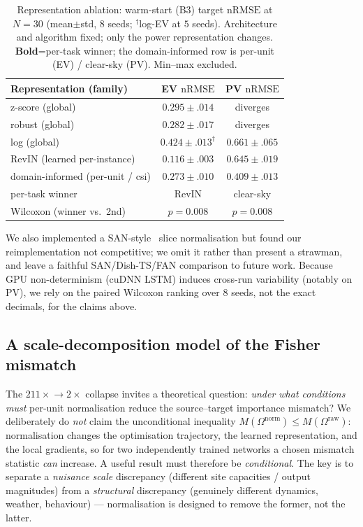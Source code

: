 \documentclass[conference]{IEEEtran}
\newcommand{\nrmse}{\mathrm{nRMSE}}
\begin{document}
\begin{table}[t]
\centering
\caption{Representation ablation: warm-start (B3) target $\nrmse$ at $N{=}30$
(mean$\pm$std, $8$ seeds; $^\dagger$log-EV at $5$ seeds). Architecture and algorithm
fixed; only the power representation changes. \textbf{Bold}=per-task winner; the
domain-informed row is per-unit (EV) / clear-sky (PV). Min--max excluded.}
\label{tab:ablation}
\begin{tabular}{lcc}
\toprule
Representation (family) & EV $\nrmse$ & PV $\nrmse$\\
\midrule
z-score (global)                 & $0.295\pm.014$ & diverges\\
robust (global)                  & $0.282\pm.017$ & diverges\\
log (global)                     & $0.424\pm.013^\dagger$ & $0.661\pm.065$\\
RevIN (learned per-instance)     & $\mathbf{0.116\pm.003}$ & $0.645\pm.019$\\
domain-informed (per-unit / csi) & $0.273\pm.010$ & $\mathbf{0.409\pm.013}$\\
\midrule
per-task winner                  & RevIN & clear-sky\\
Wilcoxon (winner vs.\ 2nd)       & $p{=}0.008$ & $p{=}0.008$\\
\bottomrule
\end{tabular}
\end{table}

\noindent We also implemented a SAN-style~\cite{SAN2023} slice normalisation but
found our reimplementation not competitive; we omit it rather than present a
strawman, and leave a faithful SAN/Dish-TS/FAN comparison to future work. Because
GPU non-determinism (cuDNN LSTM) induces cross-run variability (notably on PV), we
rely on the paired Wilcoxon ranking over $8$ seeds, not the exact decimals, for the
claims above.

\subsection{A scale-decomposition model of the Fisher mismatch}
\label{sec:scale-model}
The $211\times\!\to\!2\times$ collapse invites a theoretical question: \emph{under
what conditions must} per-unit normalisation reduce the source--target importance
mismatch? We deliberately do \emph{not} claim the unconditional inequality
$M(\Omega^{\mathrm{norm}})\le M(\Omega^{\mathrm{raw}})$: normalisation changes the
optimisation trajectory, the learned representation, and the local gradients, so
for two independently trained networks a chosen mismatch statistic \emph{can}
increase. A useful result must therefore be \emph{conditional}. The key is to
separate a \emph{nuisance scale} discrepancy (different site capacities / output
magnitudes) from a \emph{structural} discrepancy (genuinely different dynamics,
weather, behaviour) --- normalisation is designed to remove the former, not the
latter.
\end{document}
